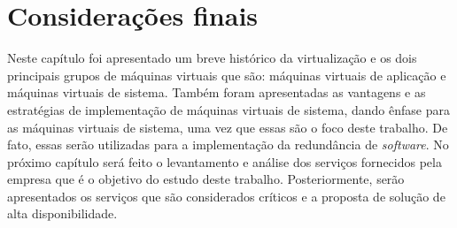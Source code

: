 \section{Considerações finais}

Neste capítulo foi apresentado um breve histórico da virtualização e os dois principais grupos de máquinas virtuais que são: máquinas virtuais 
de aplicação e máquinas virtuais de sistema. Também foram apresentadas as vantagens e as estratégias de implementação de máquinas virtuais 
de sistema, dando ênfase para as máquinas virtuais de sistema, uma vez que essas são o foco deste trabalho. De fato, essas serão utilizadas para 
a implementação da redundância de \textit{software}. No próximo capítulo será feito o levantamento e análise dos serviços fornecidos pela empresa
que é o objetivo do estudo deste trabalho. Posteriormente, serão apresentados os serviços que são considerados críticos e a proposta de solução 
de alta disponibilidade.
